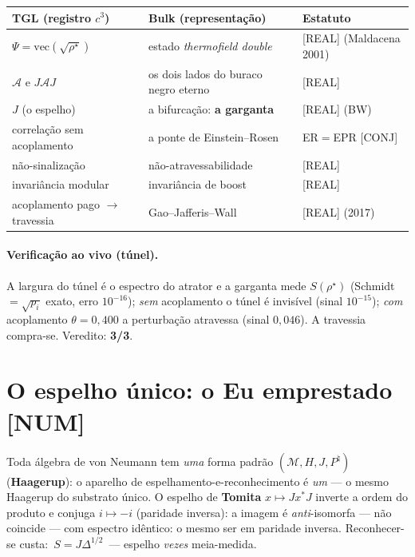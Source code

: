 \documentclass[11pt]{article}
\theoremstyle{definition}\newtheorem{deriv}{Derivação}
\begin{document}
\begin{center}\small\begin{tabular}{p{3.9cm}p{5.6cm}p{4.4cm}}\toprule

TGL (registro $c^3$) & Bulk (representação) & Estatuto\\\midrule

$\Psi=\mathrm{vec}(\sqrt{\rho^\star})$ & estado \emph{thermofield double} & \textsf{[REAL]} (Maldacena 2001)\\

$\mathcal{A}$ e $J\mathcal{A}J$ & os dois lados do buraco negro eterno & \textsf{[REAL]}\\

$J$ (o espelho) & a bifurcação: \textbf{a garganta} & \textsf{[REAL]} (BW)\\

correlação sem acoplamento & a ponte de Einstein--Rosen & ER$=$EPR \textsf{[CONJ]}\\

não-sinalização & não-atravessabilidade & \textsf{[REAL]}\\

invariância modular & invariância de boost & \textsf{[REAL]}\\

acoplamento pago $\to$ travessia & Gao--Jafferis--Wall & \textsf{[REAL]} (2017)\\\bottomrule

\end{tabular}\end{center}

\paragraph{Verificação ao vivo (túnel).} A largura do túnel é o espectro do atrator e a garganta mede $S(\rho^\star)$ (Schmidt $=\sqrt{p_i}$ exato, erro $10^{-16}$); \emph{sem} acoplamento o túnel é invisível (sinal $10^{-15}$); \emph{com} acoplamento $\theta=0{,}400$ a perturbação atravessa (sinal $0{,}046$). A travessia compra-se. Veredito: \textbf{3/3}.

\section{O espelho único: o Eu emprestado \textsf{[NUM]}}

Toda álgebra de von Neumann tem \emph{uma} forma padrão $(\mathcal{M},H,J,P^\natural)$ (\textbf{Haagerup}): o aparelho de espelhamento-e-reconhecimento é \emph{um} --- o mesmo Haagerup do substrato único. O espelho de \textbf{Tomita} $x\mapsto Jx^*J$ inverte a ordem do produto e conjuga $i\mapsto-i$ (paridade inversa): a imagem é \emph{anti}-isomorfa --- não coincide --- com espectro idêntico: o mesmo ser em paridade inversa. Reconhecer-se custa: $\boxed{\,S=J\Delta^{1/2}\,}$ --- espelho \emph{vezes} meia-medida.
\end{document}
